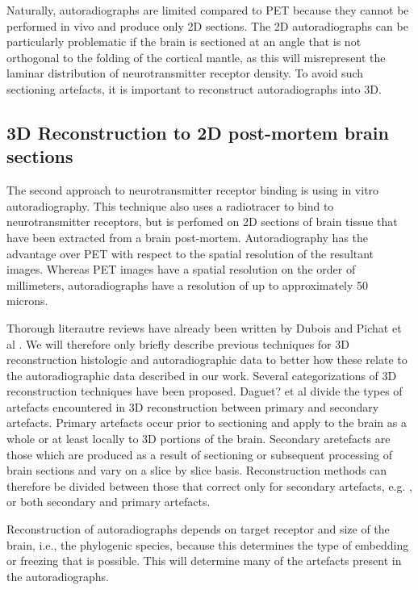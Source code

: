 \documentclass[12pt]{article}
\begin{document}
Naturally, autoradiographs are limited compared to PET because they cannot be performed in vivo and produce only 2D sections. The 2D autoradiographs can be particularly problematic if the brain is sectioned at an angle that is not orthogonal to the folding of the cortical mantle, as this will misrepresent the laminar distribution of neurotransmitter receptor density. To avoid such sectioning artefacts, it is important to reconstruct autoradiographs into 3D. 

\subsection{3D Reconstruction to 2D post-mortem brain sections}
The second approach to neurotransmitter receptor binding is using in vitro autoradiography. This technique also uses a radiotracer to bind to neurotransmitter receptors, but is perfomed on 2D sections of brain tissue that have been extracted from a brain post-mortem. Autoradiography has the advantage over PET with respect to the spatial resolution of the resultant images. Whereas PET images have a spatial resolution on the order of millimeters, autoradiographs have a resolution of up to approximately 50 microns. 

Thorough literautre reviews have already been written by Dubois \cite{Dubois2007} and Pichat et al \cite{Pichat2018}. We will therefore only briefly describe previous techniques for 3D reconstruction histologic and autoradiographic data to better how these relate to the autoradiographic data described in our work. Several categorizations of 3D reconstruction techniques have been proposed. Daguet? et al \cite{CITATION} divide the types of artefacts encountered in 3D reconstruction between primary and secondary artefacts. Primary artefacts occur prior to sectioning and apply to the brain as a whole or at least locally to 3D portions of the brain. Secondary aretefacts are those which are produced as a result of sectioning or subsequent processing of brain sections and vary on a slice by slice basis. Reconstruction methods can therefore be divided between those that correct only for secondary artefacts, e.g. \cite{Charkarboty2006}, or both secondary and primary artefacts.

Reconstruction of autoradiographs depends on target receptor and size of the brain, i.e., the phylogenic species, because this determines the type of embedding or freezing that is possible. This will determine many of the artefacts present in the autoradiographs.
\end{document}
